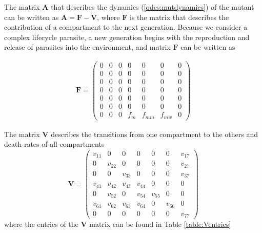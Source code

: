\documentclass{article}
\begin{document}
The matrix $\mathbf{A}$ that describes the dynamics (\ref{odes:mutdynamics}) of the mutant can be written as $\mathbf{A} = \mathbf{F} - \mathbf{V}$, where $\mathbf{F}$ is the matrix that describes the contribution of a compartment to the next generation. Because we consider a complex lifecycle parasite, a new generation begins with the reproduction and release of parasites into the environment, and matrix $\mathbf{F}$ can be written as

\begin{align*}
    \mathbf{F} = 
    \begin{pmatrix}
   	 0 & 0 & 0 & 0   & 0 	  & 0 	   & 0 \\
	 0 & 0 & 0 & 0   & 0 	  & 0 	   & 0 \\
	 0 & 0 & 0 & 0   & 0 	  & 0 	   & 0 \\
	 0 & 0 & 0 & 0   & 0      & 0	   & 0 \\
	 0 & 0 & 0 & 0   & 0      & 0      & 0 \\ 
	 0 & 0 & 0 & 0   & 0      & 0      & 0 \\
	 0 & 0 & 0 & f_m & f_{mm} & f_{mw} & 0
    \end{pmatrix}
\end{align*}

The matrix $\mathbf{V}$ describes the transitions from one compartment to the others and death rates of all compartments
\[
    \mathbf{V} = 
    \begin{pmatrix*}
     v_{11}  & 0 & 0 & 0 & 0 & 0 & v_{17} \\
     0  &  v_{22} & 0 & 0 & 0 & 0 & v_{27} \\ 
     0  &  0  &  v_{33} &  0  &  0  &  0  & v_{37} \\
    v_{41}  &  v_{42} & v_{43} &  v_{44} &  0 & 0 & 0 \\
     0 & v_{52}  &  0  & v_{54} &  v_{55} & 0 & 0  \\
     v_{61} & v_{62} & v_{63} & v_{64}  &  0  & v_{66} & 0 \\
     0  &  0  &  0  &  0  &  0  &  0  &  v_{77}
    \end{pmatrix*}
\]
where the entries of the $\mathbf{V}$ matrix can be found in Table \ref{table:Ventries}
\end{document}
